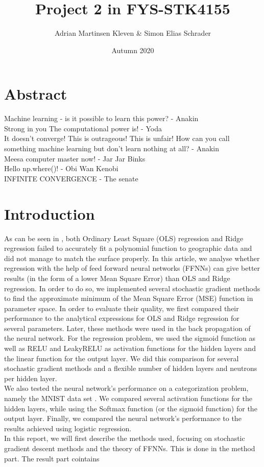 \documentclass[11pt,a4paper,titlepage]{article}
\title{Project 2 in FYS-STK4155}
\author{Adrian Martinsen Kleven & Simon Elias Schrader }
\date{Autumn 2020}
\begin{document}
\tableofcontents
\listoffigures
\listoftables

\clearpage
\section{Abstract}
Machine learning - is it possible to learn this power? - Anakin\\
Strong in you The computational power is! - Yoda\\
It doesn't converge! This is outrageous! This is unfair! How can you call something machine learning but don't learn nothing at all? - Anakin\\
Meesa computer master now! - Jar Jar Binks\\
Hello np.where()! - Obi Wan Kenobi\\
INFINITE CONVERGENCE - The senate
\section{Introduction}
As can be seen in \citep{Project1}, both Ordinary Least Square (OLS) regression and  Ridge regression failed to accurately fit a polynomial function to geographic data and did not manage to match the surface properly. In this article, we analyse whether regression with the help of feed forward neural networks (FFNNs) can give better results (in the form of a lower Mean Square Error) than OLS and Ridge regression. In order to do so, we implemented several stochastic gradient methods to find the approximate minimum of the Mean Square Error (MSE) function in parameter space. In order to evaluate their quality, we first compared their performance to the analytical expressions for OLS and Ridge regression for several parameters. Later, these methods were used in the back propagation of the neural network. For the regression problem, we used the sigmoid function as well as RELU and LeakyRELU as activation functions for the hidden layers and the linear function for the output layer. We did this comparison for several stochastic gradient methods and a flexible number of hidden layers and neutrons per hidden layer. \\
We also tested the neural network's performance on a categorization problem, namely the MNIST data set \citep{lecun2010mnist}. We compared several activation functions for the hidden layers, while using the Softmax function (or the sigmoid function) for the output layer. Finally, we compared the neural network's performance to the results achieved using logistic regression. \\
In this report, we will first describe the methods used, focusing on stochastic gradient descent methods and the theory of FFNNs. This is done in the method part. The result part cointains 
\end{document}
